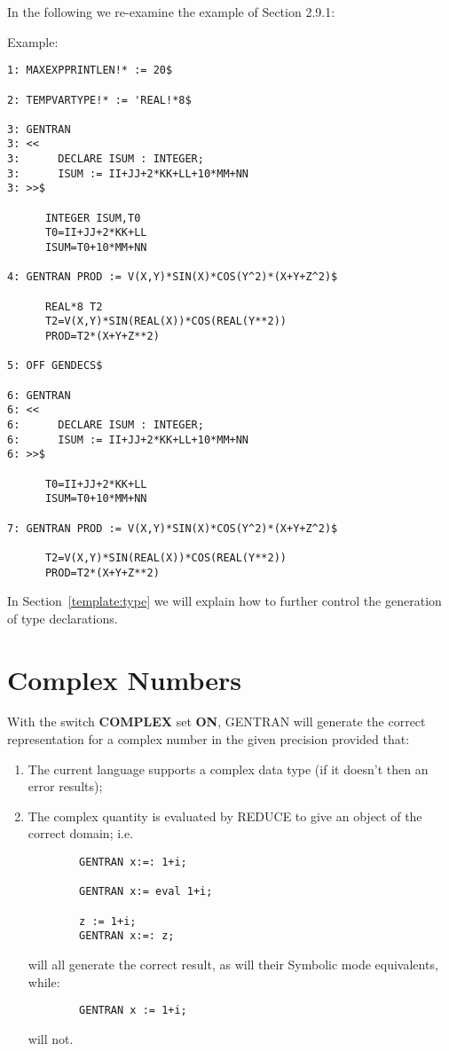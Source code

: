 In the following we re-examine the example of Section 2.9.1:
\begin{describe}{Example:}
\begin{verbatim}
1: MAXEXPPRINTLEN!* := 20$ 

2: TEMPVARTYPE!* := 'REAL!*8$

3: GENTRAN 
3: << 
3:      DECLARE ISUM : INTEGER; 
3:      ISUM := II+JJ+2*KK+LL+10*MM+NN 
3: >>$ 

      INTEGER ISUM,T0
      T0=II+JJ+2*KK+LL
      ISUM=T0+10*MM+NN

4: GENTRAN PROD := V(X,Y)*SIN(X)*COS(Y^2)*(X+Y+Z^2)$ 

      REAL*8 T2
      T2=V(X,Y)*SIN(REAL(X))*COS(REAL(Y**2))
      PROD=T2*(X+Y+Z**2)

5: OFF GENDECS$ 

6: GENTRAN 
6: <<
6:      DECLARE ISUM : INTEGER; 
6:      ISUM := II+JJ+2*KK+LL+10*MM+NN 
6: >>$ 

      T0=II+JJ+2*KK+LL
      ISUM=T0+10*MM+NN

7: GENTRAN PROD := V(X,Y)*SIN(X)*COS(Y^2)*(X+Y+Z^2)$ 

      T2=V(X,Y)*SIN(REAL(X))*COS(REAL(Y**2))
      PROD=T2*(X+Y+Z**2)
\end{verbatim}
\end{describe}
In Section~\ref{template:type}
we will explain how to further control the generation of
type declarations.

\section{Complex Numbers}
\label{complex}
With the switch {\bf COMPLEX} set {\bf ON}, GENTRAN will generate the correct
representation for a complex number in the given precision provided that:
\begin{enumerate}
\item The current language supports a complex data type (if it doesn't then
an error results);
\item The complex quantity is evaluated by REDUCE
to give an object of the correct
domain; i.e.
\begin{verbatim}
        GENTRAN x:=: 1+i;

        GENTRAN x:= eval 1+i;

        z := 1+i;
        GENTRAN x:=: z;
\end{verbatim}
will all generate the correct result, as will their Symbolic mode equivalents,
while:
\begin{verbatim}
        GENTRAN x := 1+i;
\end{verbatim}
will not.
\end{enumerate}

